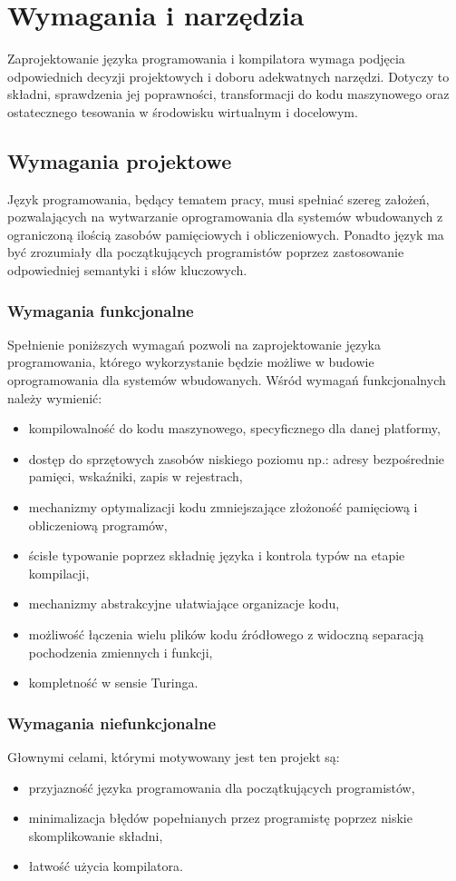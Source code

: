 \chapter{Wymagania i narzędzia}
\label{ch:03}

Zaprojektowanie języka programowania i kompilatora wymaga podjęcia odpowiednich decyzji projektowych i doboru adekwatnych narzędzi. Dotyczy to składni, sprawdzenia jej poprawności, transformacji do kodu maszynowego oraz ostatecznego tesowania w środowisku wirtualnym i docelowym.
\section{Wymagania projektowe}

Język programowania, będący tematem pracy, musi spełniać szereg założeń, pozwalających na wytwarzanie oprogramowania dla systemów wbudowanych z ograniczoną ilością zasobów pamięciowych i obliczeniowych. Ponadto język ma być zrozumiały dla początkujących programistów poprzez zastosowanie odpowiedniej semantyki i słów kluczowych.

\subsection{Wymagania funkcjonalne}
Spełnienie poniższych wymagań pozwoli na zaprojektowanie języka programowania, którego wykorzystanie będzie możliwe w budowie oprogramowania dla systemów wbudowanych. Wśród wymagań funkcjonalnych należy wymienić:
\begin{itemize}
\item kompilowalność do kodu maszynowego, specyficznego dla danej platformy,
\item dostęp do sprzętowych zasobów niskiego poziomu np.: adresy bezpośrednie pamięci, wskaźniki, zapis w rejestrach,
\item mechanizmy optymalizacji kodu zmniejszające złożoność pamięciową i obliczeniową programów,
\item ścisłe typowanie poprzez składnię języka i kontrola typów na etapie kompilacji,
\item mechanizmy abstrakcyjne ułatwiające organizacje kodu,
\item możliwość łączenia wielu plików kodu źródłowego z widoczną separacją pochodzenia zmiennych i funkcji,
\item kompletność w sensie Turinga.
\end{itemize}

\subsection{Wymagania niefunkcjonalne}
Głownymi celami, którymi motywowany jest ten projekt są:
\begin{itemize}
\item przyjazność języka programowania dla początkujących programistów,
\item minimalizacja błędów popełnianych przez programistę poprzez niskie skomplikowanie składni,
\item łatwość użycia kompilatora.
\end{itemize}

